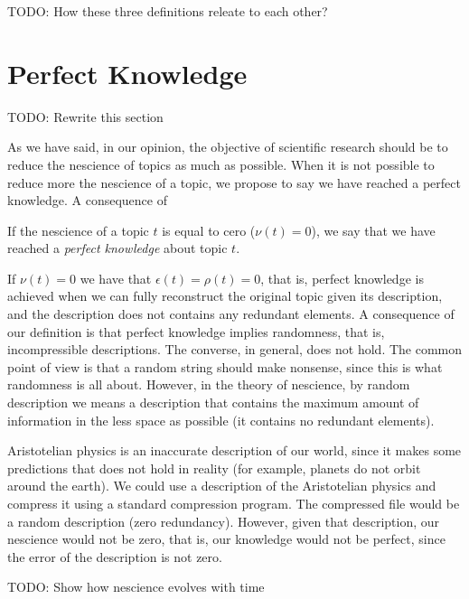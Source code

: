 {\color{red} TODO: How these three definitions releate to each other?}


%
%

\section{Perfect Knowledge}
\label{sec:perfect_knowledge}

{\color{red} TODO: Rewrite this section}

As we have said, in our opinion, the objective of scientific research should be to reduce the nescience of topics as much as possible. When it is not possible to reduce more the nescience of a topic, we propose to say we have reached a perfect knowledge. A consequence of 

\begin{definition}
If the nescience of a topic $t$ is equal to cero ($\nu(t)=0$), we say that we have reached a \emph{perfect knowledge} about topic $t$.
\end{definition}

If $\nu(t)=0$ we have that $\epsilon(t) = \rho(t) = 0$, that is, perfect knowledge is achieved when we can fully reconstruct the original topic given its description, and the description does not contains any redundant elements. A consequence of our definition is that perfect knowledge implies randomness, that is, incompressible descriptions. The converse, in general, does not hold. The common point of view is that a random string should make nonsense, since this is what randomness is all about. However, in the theory of nescience, by random description we means a description that contains the maximum amount of information in the less space as possible (it contains no redundant elements).

\begin{example}
Aristotelian physics is an inaccurate description of our world, since it makes some predictions that does not hold in reality (for example, planets do not orbit around the earth). We could use a description of the Aristotelian physics and compress it using a standard compression program. The compressed file would be a random description (zero redundancy). However, given that description, our nescience would not be zero, that is, our knowledge would not be perfect, since the error of the description is not zero.
\end{example}

{\color{red} TODO: Show how nescience evolves with time}

